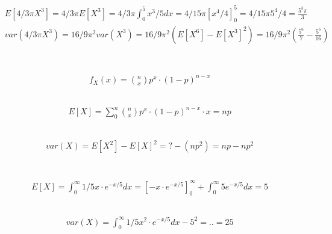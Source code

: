 \documentclass[a4paper]{article}
\begin{document}
\subsection{}
\begin{align*}
	& E[4/3 \pi X^3] = 4/3 \pi E[X^3] = 4/3 \pi \int_0^5 x^3/5 dx= 4/15 \pi [x^4/4]_0^5 = 4/15 \pi 5^4/4 = \frac{5^3 \pi}{3} \\
	& var(4/3 \pi X^3) = 16/9 \pi^2 var(X^3) = 16/9 \pi^2 (E[X^6] - E[X^3]^2) = 16/9 \pi^2 (\frac{5^6}{7} - \frac{5^6}{16}) \\
\end{align*}


\section{}
\subsection*{}
\begin{align*}
	& f_X(x) = {n \choose x} p^x \cdot (1-p)^{n - x}
\end{align*}

\subsection*{}
\begin{align*}
	& E[X] = \sum_0^n {n \choose x} p^x \cdot (1-p)^{n - x} \cdot x = np
\end{align*}

\subsection*{}
\begin{align*}
	& var(X) = E[X^2] - E[X]^2 = ? - (np^2) = np-np^2
\end{align*}

\section{}
\subsection*{}
\begin{align*}
	& E[X] = \int_0^\infty 1/5 x \cdot e^{-x/5} dx = [- x \cdot e^{-x/5}]_0^\infty + \int_0^\infty 5 e^{-x/5} dx = 5
\end{align*}

\subsection*{}
\begin{align*}
	& var(X) = \int_0^\infty 1/5 x^2 \cdot e^{-x/5} dx - 5^2 = .. = 25
\end{align*}
\end{document}

